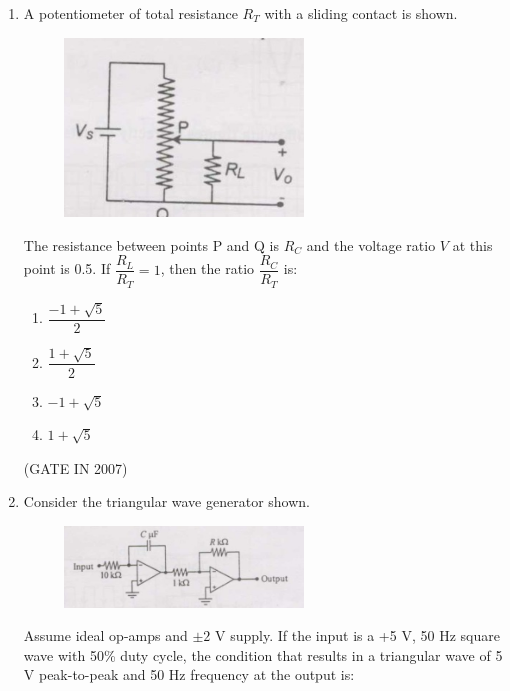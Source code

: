 \documentclass[journal]{IEEEtran}
\begin{document}
\begin{enumerate}
\begin{multicols}{4}
\begin{enumerate}
    \item $T > \dfrac{100}{xf_c}$
    \item $T < \dfrac{100}{xf_c}$
    \item $T > \dfrac{200}{xf_c}$
    \item $T < \dfrac{200}{xf_c}$
\end{enumerate}
\end{multicols}
\hfill(GATE IN 2007)
\item A potentiometer of total resistance $R_T$ with a sliding contact is shown. 
\begin{figure}[H]
    \centering
      \includegraphics[width=0.6\textwidth]{51.jpg} 
      \caption{}
    \label{fig:fig51} 
\end{figure}
The resistance between points P and Q is $R_C$ and the voltage ratio $V$ at this point is 0.5. If $\dfrac{R_L}{R_T} = 1$, then the ratio $\dfrac{R_C}{R_T}$ is:

\begin{multicols}{4}
\begin{enumerate}
    \item $\dfrac{-1 + \sqrt{5}}{2}$
    \item $\dfrac{1 + \sqrt{5}}{2}$
    \item $-1 + \sqrt{5}$
    \item $1 + \sqrt{5}$
\end{enumerate}
\end{multicols}
\hfill(GATE IN 2007)
\item Consider the triangular wave generator shown.
\begin{figure}[H]
    \centering
      \includegraphics[width=0.6\textwidth]{52.jpg} 
      \caption{}
    \label{fig:fig52} 
\end{figure}
Assume ideal op-amps and $\pm2$ V supply. If the input is a +5 V, 50 Hz square wave with 50\% duty cycle, the condition that results in a triangular wave of 5 V peak-to-peak and 50 Hz frequency at the output is:


\end{enumerate}
\end{document}
